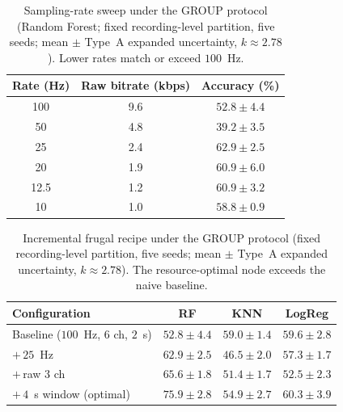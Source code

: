 \begin{table}[t]
\centering
\caption{Sampling-rate sweep under the GROUP protocol (Random Forest;
fixed recording-level partition, five seeds; mean $\pm$ Type~A expanded
uncertainty, $k\approx2.78$). Lower rates match or exceed $100$~Hz.}
\label{tab:sampling}
\renewcommand{\arraystretch}{1.2}
\begin{tabular}{@{}ccc@{}}
\toprule
\textbf{Rate (Hz)} & \textbf{Raw bitrate (kbps)} & \textbf{Accuracy (\%)} \\
\midrule
100  & 9.6 & $52.8 \pm 4.4$ \\
50   & 4.8 & $39.2 \pm 3.5$ \\
25   & 2.4 & $\mathbf{62.9 \pm 2.5}$ \\
20   & 1.9 & $60.9 \pm 6.0$ \\
12.5 & 1.2 & $60.9 \pm 3.2$ \\
10   & 1.0 & $58.8 \pm 0.9$ \\
\bottomrule
\end{tabular}
\end{table}

\begin{table}[t]
\centering
\caption{Incremental frugal recipe under the GROUP protocol
(fixed recording-level partition, five seeds; mean $\pm$ Type~A expanded
uncertainty, $k\approx2.78$). The resource-optimal node exceeds the naive
baseline.}
\label{tab:recipe}
\renewcommand{\arraystretch}{1.2}
\begin{tabular}{@{}lccc@{}}
\toprule
\textbf{Configuration} & \textbf{RF} & \textbf{KNN} & \textbf{LogReg} \\
\midrule
Baseline ($100$~Hz, $6$ ch, $2$~s) & $52.8 \pm 4.4$ & $59.0 \pm 1.4$ & $59.6 \pm 2.8$ \\
\;$+\,25$~Hz                        & $62.9 \pm 2.5$ & $46.5 \pm 2.0$ & $57.3 \pm 1.7$ \\
\;$+\,$raw $3$ ch                   & $65.6 \pm 1.8$ & $51.4 \pm 1.7$ & $52.5 \pm 2.3$ \\
\;$+\,4$~s window (optimal)         & $\mathbf{75.9 \pm 2.8}$ & $54.9 \pm 2.7$ & $60.3 \pm 3.9$ \\
\bottomrule
\end{tabular}
\end{table}

